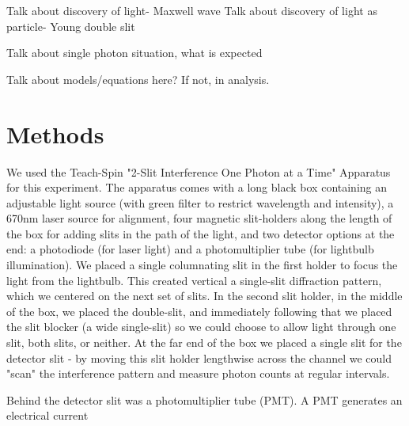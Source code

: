 \documentclass[prb,preprint]{revtex4-1}
\begin{document}
Talk about discovery of light- Maxwell wave
Talk about discovery of light as particle- Young double slit

Talk about single photon situation, what is expected

Talk about models/equations here?  If not, in analysis.


\section{Methods}

We used the Teach-Spin "2-Slit Interference One Photon at a Time" Apparatus for this experiment.  The apparatus comes with a long black box containing an adjustable light source (with green filter to restrict wavelength and intensity), a 670nm laser source for alignment, four magnetic slit-holders along the length of the box for adding slits in the path of the light, and two detector options at the end: a photodiode (for laser light) and a photomultiplier tube (for lightbulb illumination).  We placed a single columnating slit in the first holder to focus the light from the lightbulb. This created vertical a single-slit diffraction pattern, which we centered on the next set of slits.  In the second slit holder, in the middle of the box, we placed the double-slit, and immediately following that we placed the slit blocker (a wide single-slit) so we could choose to allow light through one slit, both slits, or neither.  At the far end of the box we placed a single slit for the detector slit - by moving this slit holder lengthwise across the channel we could "scan" the interference pattern and measure photon counts at regular intervals.  

Behind the detector slit was a photomultiplier tube (PMT).  A PMT generates an electrical current
\end{document}
